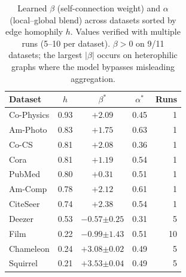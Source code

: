
\begin{table}[t]
\centering
\caption{Learned $\beta$ (self-connection weight) and $\alpha$ (local--global blend)
across datasets sorted by edge homophily $h$.
Values verified with multiple runs (5--10 per dataset).
$\beta > 0$ on 9/11 datasets; the largest $|\beta|$ occurs on
heterophilic graphs where the model bypasses misleading aggregation.}
\label{tab:beta_values}
\begin{tabular}{lcccr}
\toprule
\textbf{Dataset} & \textbf{$h$} & \textbf{$\beta^*$} & \textbf{$\alpha^*$} & \textbf{Runs} \\
\midrule
Co-Physics       & 0.93 & $+2.09$ & 0.45 & 1 \\
Am-Photo         & 0.83 & $+1.75$ & 0.63 & 1 \\
Co-CS            & 0.81 & $+2.08$ & 0.36 & 1 \\
Cora             & 0.81 & $+1.19$ & 0.54 & 1 \\
PubMed           & 0.80 & $+0.31$ & 0.51 & 1 \\
Am-Comp          & 0.78 & $+2.12$ & 0.61 & 1 \\
CiteSeer         & 0.74 & $+2.38$ & 0.54 & 1 \\
\midrule
Deezer           & 0.53 & $-0.57{\scriptstyle\pm0.25}$ & 0.31 & 5 \\
Film             & 0.22 & $-0.99{\scriptstyle\pm1.43}$ & 0.51 & 10 \\
Chameleon        & 0.24 & $+3.08{\scriptstyle\pm0.02}$ & 0.49 & 5 \\
Squirrel         & 0.21 & $+3.53{\scriptstyle\pm0.04}$ & 0.49 & 5 \\
\bottomrule
\end{tabular}
\end{table}
%
